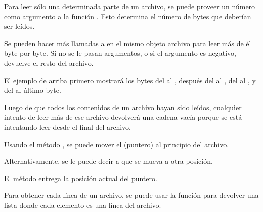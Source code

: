 
Para leer sólo una determinada parte de un archivo, se puede proveer un número como argumento a la función .
Esto determina el número de bytes que deberían ser leídos.\medskip

Se pueden hacer más llamadas a  en el mismo objeto archivo para leer más de él byte por byte.
Si no se le pasan argumentos, o si el argumento es negativo,  devuelve el resto del archivo.


El ejemplo de arriba primero mostrará los bytes del  al , después del  al , del  al , y del  al último byte.\medskip

Luego de que todos los contenidos de un archivo hayan sido leídos, cualquier intento de leer más de ese archivo devolverá una cadena vacía \ttt{\qq \qq} porque se está intentando leer desde el final del archivo.


Usando el método , se puede mover el  (puntero) al principio del archivo.


Alternativamente, se le puede decir a  que se mueva a otra posición.


El método  entrega la posición actual del puntero.


Para obtener cada línea de un archivo, se puede usar la función  para devolver una lista donde cada elemento es una línea del archivo.


